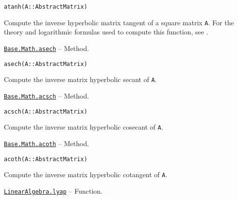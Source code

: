 \begin{adjustwidth}{2em}{0pt}


\begin{verbatim}
atanh(A::AbstractMatrix)
\end{verbatim}

Compute the inverse hyperbolic matrix tangent of a square matrix \texttt{A}.  For the theory and logarithmic formulas used to compute this function, see \footnotemark[17].



\end{adjustwidth}
\hypertarget{16565521219183952619}{}
\hyperlink{16565521219183952619}{\texttt{Base.Math.asech}}  -- {Method.}

\begin{adjustwidth}{2em}{0pt}


\begin{verbatim}
asech(A::AbstractMatrix)
\end{verbatim}

Compute the inverse matrix hyperbolic secant of \texttt{A}.



\end{adjustwidth}
\hypertarget{14527295447092920563}{}
\hyperlink{14527295447092920563}{\texttt{Base.Math.acsch}}  -- {Method.}

\begin{adjustwidth}{2em}{0pt}


\begin{verbatim}
acsch(A::AbstractMatrix)
\end{verbatim}

Compute the inverse matrix hyperbolic cosecant of \texttt{A}.



\end{adjustwidth}
\hypertarget{6937978161263127675}{}
\hyperlink{6937978161263127675}{\texttt{Base.Math.acoth}}  -- {Method.}

\begin{adjustwidth}{2em}{0pt}


\begin{verbatim}
acoth(A::AbstractMatrix)
\end{verbatim}

Compute the inverse matrix hyperbolic cotangent of \texttt{A}.



\end{adjustwidth}
\hypertarget{13191775510498989455}{}
\hyperlink{13191775510498989455}{\texttt{LinearAlgebra.lyap}}  -- {Function.}

